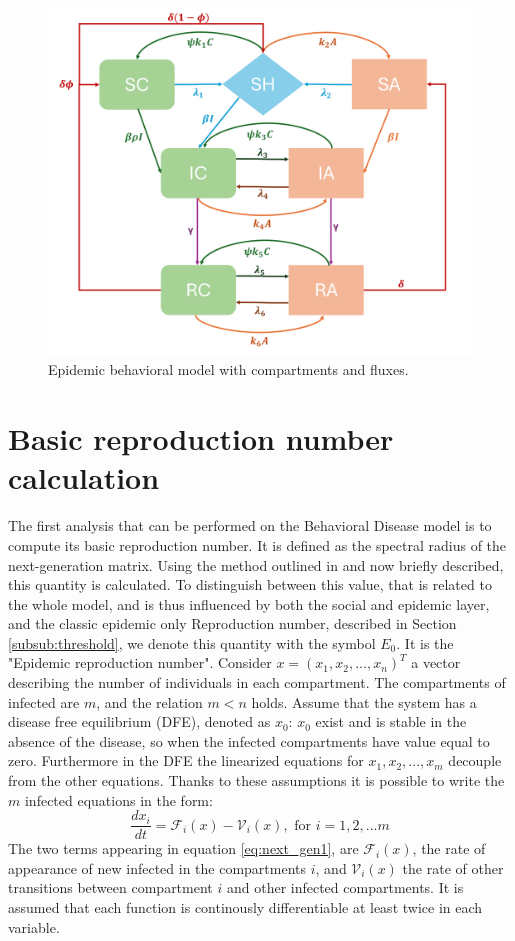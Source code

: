 \begin{figure}
	\centering
	\includegraphics[height=0.8\linewidth]{1_corpo/figure/model_SAHCIR}
	\caption[Epidemic behavior model]{Epidemic behavioral model with compartments and fluxes.}
	\label{fig:epibehaviourmodelfigure}
\end{figure}

\section{Basic reproduction number calculation}
The first analysis that can be performed on the Behavioral Disease model is to compute its basic reproduction number. It is defined as the spectral radius of the next-generation matrix. Using the method outlined in \cite{van_den_Driessche_2017} and now briefly described, this quantity is calculated. To distinguish between this value, that is related to the whole model, and is thus influenced by both the social and epidemic layer, and the classic epidemic only Reproduction number, described in Section \ref{subsub:threshold}, we denote this quantity with the symbol $E_0$. It is the "Epidemic reproduction number". 
Consider $x = (x_1,x_2,...,x_n)^T$ a vector describing the number of individuals in each compartment. The compartments of infected are $m$, and the relation $m < n$ holds. 
Assume that the system has a disease free equilibrium (DFE), denoted as $x_0$: $x_0$ exist and is stable in the absence of the disease, so when the infected compartments have value equal to zero. Furthermore in the DFE the linearized equations for $x_1,x_2,...,x_m$ decouple from the other equations. Thanks to these assumptions it is possible to write the $m$ infected equations in the form:
\begin{equation}
\label{eq:next_gen1}
\frac{dx_i}{dt} = \mathcal{F}_i(x) - \mathcal{V}_i(x), \text{ for } i =1,2,...m
\end{equation}
The two terms appearing in equation \eqref{eq:next_gen1}, are $\mathcal{F}_i(x)$, the rate of appearance of new infected in the compartments $i$, and $ \mathcal{V}_i(x)$ the rate of other transitions between compartment $i$ and other infected compartments. It is assumed that each function is continously differentiable at least twice in each variable.

